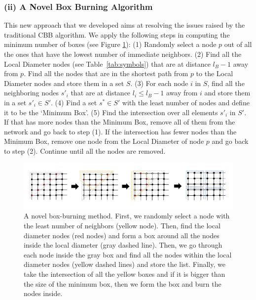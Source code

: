 \documentclass[9pt,onecolumn,twoside]{pnas-new}
\begin{document}
{\subsubsection*{(ii) A Novel Box Burning Algorithm}

This new approach that we developed aims at resolving the issues raised by the traditional CBB algorithm. We apply the following steps in computing the minimum number of boxes (see Figure \ref{fig:box-burning}):
(1) Randomly select a node $p$ out of all the ones that have the lowest number of immediate neighbors. 
(2) Find all the Local Diameter nodes (see Table~\ref{tab:symbols}) that are at distance $l_B-1$ away from $p$. Find all the nodes that are in the shortest path from $p$ to the Local Diameter nodes and store them in a set $S$. 
(3) For each node $i$ in $S$, find all the neighboring nodes $s'_i$ that are at distance $l_i \leq l_B-1$ away from $i$ and store them in a set $s'_i \in S'$. 
(4) Find a set $s^* \in S'$ with the least number of nodes and define it to be the `Minimum Box'. 
(5) Find the intersection over all elements $s'_i$ in $S'$. If that has more nodes than the Minimum Box, remove all of them from the network and go back to step (1). 
If the intersection has fewer nodes than the Minimum Box, remove one node from the Local Diameter of node $p$ and go back to step (2). Continue until all the nodes are removed.

\begin{figure}
    \centering
    \includegraphics[width=1.03\columnwidth]{images/new_burning.pdf}
    \vspace{-2.5em}
    \caption{A novel box-burning method. First, we randomly select a node with the least number of neighbors (yellow node). Then, find the local diameter nodes (red nodes) and form a box around all the nodes inside the local diameter (gray dashed line). Then, we go through each node inside the gray box and find all the nodes within the local diameter nodes (yellow dashed lines) and store the list. Finally, we take the intersection of all the yellow boxes and if it is bigger than the size of the minimum box, then we form the box and burn the nodes inside.}
    \label{fig:box-burning}
\end{figure}

} %
\end{document}
